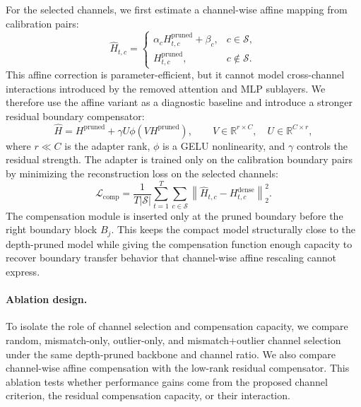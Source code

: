 For the selected channels, we first estimate a channel-wise affine mapping from calibration pairs:
\begin{equation}
\hat{H}_{t,c} =
\begin{cases}
\alpha_c H^{\mathrm{pruned}}_{t,c} + \beta_c, & c\in\mathcal{S},\\
H^{\mathrm{pruned}}_{t,c}, & c\notin\mathcal{S}.
\end{cases}
\end{equation}
This affine correction is parameter-efficient, but it cannot model cross-channel interactions introduced by the removed attention and MLP sublayers. We therefore use the affine variant as a diagnostic baseline and introduce a stronger residual boundary compensator:
\begin{equation}
\hat{H}
= H^{\mathrm{pruned}}
+ \gamma U \phi(V H^{\mathrm{pruned}}),
\qquad
V\in\mathbb{R}^{r\times C},\quad
U\in\mathbb{R}^{C\times r},
\end{equation}
where $r\ll C$ is the adapter rank, $\phi$ is a GELU nonlinearity, and $\gamma$ controls the residual strength. The adapter is trained only on the calibration boundary pairs by minimizing the reconstruction loss on the selected channels:
\begin{equation}
\mathcal{L}_{\mathrm{comp}}
=
\frac{1}{T|\mathcal{S}|}
\sum_{t=1}^{T}\sum_{c\in\mathcal{S}}
\left\|
\hat{H}_{t,c}
- H^{\mathrm{dense}}_{t,c}
\right\|_2^2 .
\end{equation}
The compensation module is inserted only at the pruned boundary before the right boundary block $B_j$. This keeps the compact model structurally close to the depth-pruned model while giving the compensation function enough capacity to recover boundary transfer behavior that channel-wise affine rescaling cannot express.

\paragraph{Ablation design.}
To isolate the role of channel selection and compensation capacity, we compare random, mismatch-only, outlier-only, and mismatch+outlier channel selection under the same depth-pruned backbone and channel ratio. We also compare channel-wise affine compensation with the low-rank residual compensator. This ablation tests whether performance gains come from the proposed channel criterion, the residual compensation capacity, or their interaction.
